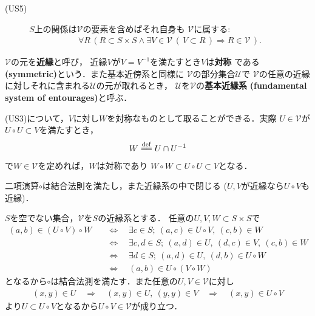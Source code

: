 \begin{screen}
\begin{dfn}[近縁系]
\begin{description}
				\item[(US5)] $S$上の関係は$\mathscr{V}$の要素を含めばそれ自身も
					$\mathscr{V}$に属する:
					\begin{align}
						\forall R\,
						\left( R \subset S \times S \wedge 
						\exists V \in \mathscr{V}\, \left(\, V \subset R\, \right)
						\Longrightarrow R \in \mathscr{V}\, \right).
					\end{align}
			\end{description}
			$\mathscr{V}$の元を{\bf 近縁}と呼び，
			近縁$V$が$V = V^{-1}$を満たすとき$V$は{\bf 対称}
			である{\bf (symmetric)}という．また基本近傍系と同様に
			$\mathscr{V}$の部分集合$\mathscr{U}$で
			$\mathscr{V}$の任意の近縁に対しそれに含まれる$\mathscr{U}$の元が取れるとき，
			$\mathscr{U}$を$\mathscr{V}$の{\bf 基本近縁系}
			{\bf (fundamental system of entourages)}と呼ぶ．
		\end{dfn}
	\end{screen}
	(US3)について，$V$に対し$W$を対称なものとして取ることができる．実際
	$U \in \mathscr{V}$が$U \circ U \subset V$を満たすとき，
	\begin{align}
		W \defeq U \cap U^{-1}
	\end{align}
	で$W \in \mathscr{V}$を定めれば，$W$は対称であり
	$W \circ W \subset U \circ U \subset V$となる．
	
	\begin{screen}
		\begin{thm}
		\label{thm:uniform_structure_is_a_semigroup}
			二項演算$\circ$は結合法則を満たし，また近縁系の中で閉じる
			($U,V$が近縁なら$U \circ V$も近縁)．
		\end{thm}
	\end{screen}
	
	\begin{prf}
		$S$を空でない集合，$\mathscr{V}$を$S$の近縁系とする．
		任意の$U,V,W \subset S \times S$で
		\begin{align}
			(a,b) \in (U \circ V) \circ W
			&\quad \Longleftrightarrow \quad
			\exists c \in S;\ (a,c) \in U \circ V,\ (c,b) \in W \\
			&\quad \Longleftrightarrow \quad
			\exists c,d \in S;\ (a,d) \in U,\ (d,c) \in V,\ (c,b) \in W \\
			&\quad \Longleftrightarrow \quad
			\exists d \in S;\ (a,d) \in U,\ (d,b) \in U \circ W \\
			&\quad \Longleftrightarrow \quad
			(a,b) \in U \circ (V \circ W)
		\end{align}
		となるから$\circ$は結合法測を満たす．また任意の$U,V \in \mathscr{V}$に対し
		\begin{align}
			(x,y) \in U \quad \Longrightarrow \quad
			(x,y) \in U,\ (y,y) \in V \quad \Longrightarrow \quad
			(x,y) \in U \circ V
		\end{align}
		より$U \subset U \circ V$となるから$U \circ V \in \mathscr{V}$が成り立つ．
		\QED
	\end{prf}
	
